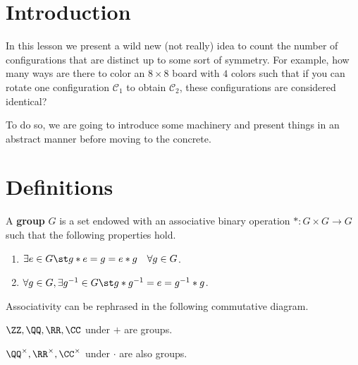 \documentclass[letterpaper]{article}
\begin{document}
\section{Introduction}
In this lesson we present a wild new (not really) idea to count the number of
configurations that are distinct up to some sort of symmetry.  For example, how
many ways are there to color an $8 \times 8$ board with $4$ colors such that if
you can rotate one configuration $\mathcal{C}_1$ to obtain $\mathcal{C}_2$,
these configurations are considered identical?

To do so, we are going to introduce some machinery and present things in an
abstract manner before moving to the concrete.

\section{Definitions}
\begin{df}
A \textbf{group} $G$ is a set endowed with an associative binary operation $* :
G \times G \to G$ such that the following properties hold.
\begin{enumerate}
\item
$\exists e \in G \st g * e = g = e * g \quad \forall g \in G$.
\item
$\forall g \in G, \exists g^{-1} \in G \st g * g^{-1} = e = g^{-1} * g$.
\end{enumerate}
\end{df}

\begin{rem}
Associativity can be rephrased in the following commutative diagram.
\begin{center}
\end{center}
\end{rem}

\begin{ex}
$\ZZ, \QQ, \RR, \CC$ under $+$ are groups.
\end{ex}

\begin{ex}
$\QQ^\times, \RR^\times, \CC^\times$ under $\cdot$ are also groups.
\end{ex}
\end{document}
